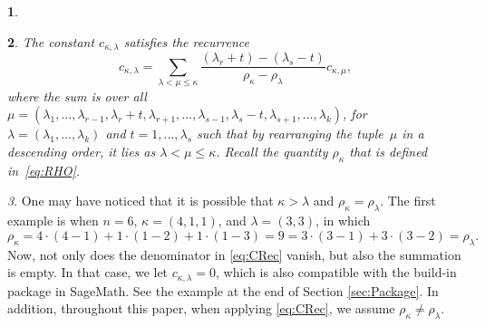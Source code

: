 \documentclass{mathincs}
\numberwithin{equation}{section}
\numberwithin{figure}{section}
\theoremstyle{plain}
\newtheorem{thm}{\protect\theoremname}[section]
\theoremstyle{definition}
\theoremstyle{remark}
\newtheorem{rem}[thm]{\protect\remarkname}
\theoremstyle{plain}
\theoremstyle{definition}
\newtheorem{example}[thm]{\protect\examplename}
\theoremstyle{plain}
\theoremstyle{plain}
\providecommand{\examplename}{Example}
\providecommand{\remarkname}{Remark}
\providecommand{\theoremname}{Theorem}
\begin{document}
\begin{example}
\end{example}
\begin{thm}
The constant $c_{\kappa,\lambda}$ satisfies the recurrence \cite[eq.~14]{Muirhead}
\begin{equation}\label{eq:CRec}
  c_{\kappa,\lambda} =
  \sum_{\lambda<\mu\leq\kappa}\frac{\left(\lambda_{r}+t\right)-\left(\lambda_{s}-t\right)}{\rho_{\kappa}-\rho_{\lambda}}c_{\kappa,\mu},
\end{equation}
where the sum is over all $ \mu=\left(\lambda_1,\ldots,\lambda_{r-1},\lambda_r+t,\lambda_{r+1},\ldots,
  \lambda_{s-1},\lambda_s-t,\lambda_{s+1},\ldots,\lambda_k\right)$, for $\lambda=\left(\lambda_1,\ldots,\lambda_k\right)$
and $t=1,\ldots,\lambda_s$ such that by rearranging the tuple~$\mu$
in a descending order, it lies as $\lambda<\mu\leq\kappa$. Recall the quantity
$\rho_\kappa$ that is defined in~\eqref{eq:RHO}.
\end{thm}

\begin{rem}
One may have noticed that it is possible that $\kappa>\lambda$ and $\rho_\kappa=\rho_\lambda$. The first example is when $n=6$, $\kappa=(4,1,1)$, and $\lambda=(3,3)$, in which 
\[
\rho_\kappa=4\cdot(4-1)+1\cdot(1-2)+1\cdot(1-3)=9=3\cdot(3-1)+3\cdot(3-2)=\rho_\lambda.
\]
Now, not only does the denominator in \eqref{eq:CRec} vanish, but also the summation is empty. In that case, we let $c_{\kappa,\lambda}=0$, which is also compatible with the build-in package in SageMath. See the example at the end of Section \ref{sec:Package}. In addition, throughout this paper, when applying \eqref{eq:CRec}, we assume $\rho_\kappa\neq\rho_\lambda$.
\end{rem}
\end{document}
